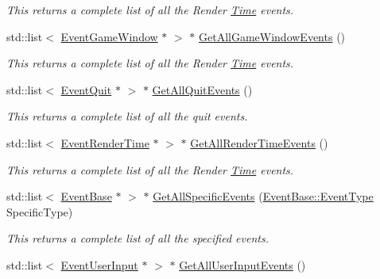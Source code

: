 \begin{DoxyCompactItemize}
\begin{DoxyCompactList}\small\item\em This returns a complete list of all the Render \hyperlink{structphys_1_1Time}{Time} events. \item\end{DoxyCompactList}\item 
std::list$<$ \hyperlink{classphys_1_1EventGameWindow}{EventGameWindow} $\ast$ $>$ $\ast$ \hyperlink{classphys_1_1EventManager_aacdd185f6334f1258d0d7022bae3932d}{GetAllGameWindowEvents} ()
\begin{DoxyCompactList}\small\item\em This returns a complete list of all the Render \hyperlink{structphys_1_1Time}{Time} events. \item\end{DoxyCompactList}\item 
std::list$<$ \hyperlink{classphys_1_1EventQuit}{EventQuit} $\ast$ $>$ $\ast$ \hyperlink{classphys_1_1EventManager_afefd52a9693bc5541592997abbf3c53f}{GetAllQuitEvents} ()
\begin{DoxyCompactList}\small\item\em This returns a complete list of all the quit events. \item\end{DoxyCompactList}\item 
std::list$<$ \hyperlink{classphys_1_1EventRenderTime}{EventRenderTime} $\ast$ $>$ $\ast$ \hyperlink{classphys_1_1EventManager_aee73dff2d113826b8c01db7f7417d527}{GetAllRenderTimeEvents} ()
\begin{DoxyCompactList}\small\item\em This returns a complete list of all the Render \hyperlink{structphys_1_1Time}{Time} events. \item\end{DoxyCompactList}\item 
std::list$<$ \hyperlink{classphys_1_1EventBase}{EventBase} $\ast$ $>$ $\ast$ \hyperlink{classphys_1_1EventManager_a300e537d27cd53ac8276438d4c91a3f6}{GetAllSpecificEvents} (\hyperlink{classphys_1_1EventBase_a5e6a8564e127f654123f0bf6a2751923}{EventBase::EventType} SpecificType)
\begin{DoxyCompactList}\small\item\em This returns a complete list of all the specified events. \item\end{DoxyCompactList}\item 
std::list$<$ \hyperlink{classphys_1_1EventUserInput}{EventUserInput} $\ast$ $>$ $\ast$ \hyperlink{classphys_1_1EventManager_aef240dacae9479c4385d540e4feab867}{GetAllUserInputEvents} ()

\end{DoxyCompactItemize}
